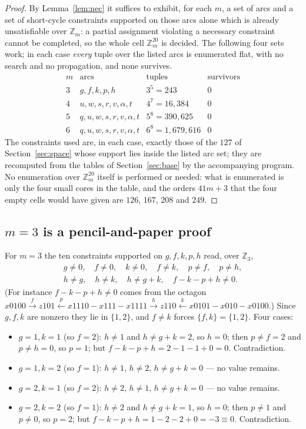 \documentclass[11pt]{amsart}
\theoremstyle{remark}
\begin{document}
\begin{proof}
By Lemma~\ref{lem:nec} it suffices to exhibit, for each $m$, a set of arcs and a set of
short-cycle constraints supported on those arcs alone which is already unsatisfiable over
$\mathbb{Z}_m$: a partial assignment violating a necessary constraint cannot be completed, so
the whole cell $\mathbb{Z}_m^{20}$ is decided. The following four sets work; in each case
\emph{every} tuple over the listed arcs is enumerated flat, with no search and no propagation,
and none survives.
\[
\begin{array}{c|l|r|r}
 m & \text{arcs} & \text{tuples} & \text{survivors}\\\hline
 3 & g,f,k,p,h & 3^{5}=243 & 0\\
 4 & u,w,s,r,v,\alpha,t & 4^{7}=16{,}384 & 0\\
 5 & q,u,w,s,r,v,\alpha,t & 5^{8}=390{,}625 & 0\\
 6 & q,u,w,s,r,v,\alpha,t & 6^{8}=1{,}679{,}616 & 0
\end{array}
\]
The constraints used are, in each case, exactly those of the $127$ of Section~\ref{sec:space}
whose support lies inside the listed arc set; they are recomputed from the tables of
Section~\ref{sec:base} by the accompanying program. No enumeration over $\mathbb{Z}_m^{20}$
itself is performed or needed: what is enumerated is only the four small cores in the table, and
the orders $41m+3$ that the four empty cells would have given are $126$, $167$, $208$ and $249$.
\end{proof}

\subsection*{$m=3$ is a pencil-and-paper proof}
For $m=3$ the ten constraints supported on $g,f,k,p,h$ read, over $\mathbb{Z}_3$,
\begin{gather*}
 g\ne 0,\quad f\ne 0,\quad k\ne 0,\quad f\ne k,\quad p\ne f,\quad p\ne h,\\
 h\ne g,\quad h\ne k,\quad h\ne g+k,\quad f-k-p+h\ne 0 .
\end{gather*}
(For instance $f-k-p+h\ne0$ comes from the octagon
$x0100 \xrightarrow{f} z101 \xleftarrow{p} x1110 - x111 - x1111 \xrightarrow{h} z110
\xleftarrow{k} x0101 - x010 - x0100$.) Since $g,f,k$ are nonzero they lie in $\{1,2\}$, and
$f\ne k$ forces $\{f,k\}=\{1,2\}$. Four cases:

\begin{itemize}
\item $g=1,k=1$ (so $f=2$): $h\ne 1$ and $h\ne g+k=2$, so $h=0$; then $p\ne f=2$ and
      $p\ne h=0$, so $p=1$; but $f-k-p+h=2-1-1+0=0$. Contradiction.
\item $g=1,k=2$ (so $f=1$): $h\ne 1$, $h\ne 2$, $h\ne g+k=0$ --- no value remains.
\item $g=2,k=1$ (so $f=2$): $h\ne 2$, $h\ne 1$, $h\ne g+k=0$ --- no value remains.
\item $g=2,k=2$ (so $f=1$): $h\ne 2$ and $h\ne g+k=1$, so $h=0$; then $p\ne 1$ and $p\ne 0$, so
      $p=2$; but $f-k-p+h=1-2-2+0=-3\equiv 0$. Contradiction.
\end{itemize}
\end{document}
